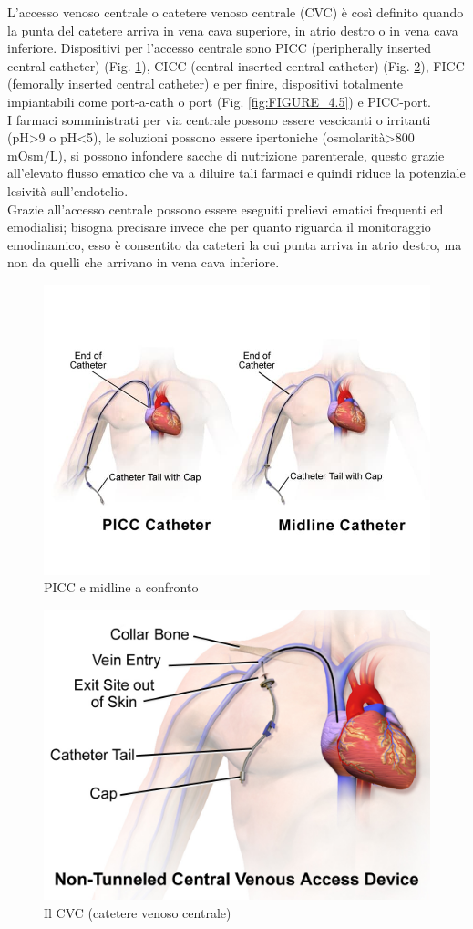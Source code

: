 L'accesso venoso centrale o catetere venoso centrale (CVC) è così definito quando la punta del catetere arriva in 
vena cava superiore, in atrio destro o in vena cava inferiore. Dispositivi per l'accesso centrale sono PICC 
(peripherally inserted central catheter) (Fig. \ref{fig:FIGURE_4.3}), CICC (central inserted central catheter) 
(Fig. \ref{fig:FIGURE_4.4}), FICC (femorally inserted central catheter) e per finire, 
dispositivi totalmente impiantabili come port-a-cath o port (Fig. \ref{fig:FIGURE_4.5}) e PICC-port\cite{GAVECELTracc2021}.\\
I farmaci somministrati per via centrale possono essere vescicanti o irritanti (pH>9 o pH<5), le soluzioni possono essere 
ipertoniche (osmolarità>800 mOsm/L), si possono infondere sacche di nutrizione parenterale\cite{LINEEGUIDA},
questo grazie all'elevato flusso ematico che va a diluire tali farmaci e quindi riduce 
la potenziale lesività sull'endotelio\cite{GAVECELTracc2021}.\\
Grazie all'accesso centrale possono essere eseguiti prelievi ematici frequenti ed emodialisi; bisogna precisare 
invece che per quanto riguarda il monitoraggio emodinamico, esso è consentito da cateteri 
la cui punta arriva in atrio destro, ma non da quelli che arrivano in vena cava inferiore\cite{GAVECELTracc2021}.

\begin{figure}[H]
    \begin{center}
    \includegraphics[width=0.5\columnwidth]{img/picc.jpeg}
    \vspace{-3mm}
    \end{center}
    \caption{PICC e midline a confronto
    \cite{img40}}
    \label{fig:FIGURE_4.3}
\end{figure}

\begin{figure}[H]
    \begin{center}
    \includegraphics[width=0.3\columnwidth]{img/CVC.png}
    \vspace{-3mm}
    \end{center}
    \caption{Il CVC (catetere venoso centrale)
    \cite{img41}}
    \label{fig:FIGURE_4.4}
\end{figure}

